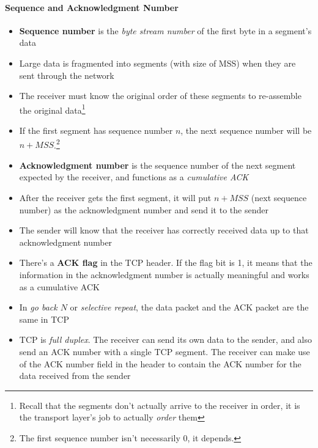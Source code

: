 \paragraph{Sequence and Acknowledgment Number}
\begin{itemize}
	\item \textbf{Sequence number} is the \textit{byte stream number} of the first byte in a segment's data
	\item Large data is fragmented into segments (with size of MSS) when they are sent through the network
	\item The receiver must know the original order of these segments to re-assemble the original data\footnote{Recall that the segments don't actually arrive to the receiver in order, it is the transport layer's job to actually \textit{order} them}
	\item If the first segment has sequence number $n$, the next sequence number will be $n+MSS$.\footnote{The first sequence number isn't necessarily 0, it depends.}
	\item \textbf{Acknowledgment number} is the sequence number of the next segment expected by the receiver, and functions as a \textit{cumulative ACK}
	\item After the receiver gets the first segment, it will put $n + MSS$ (next sequence number) as the acknowledgment number and send it to the sender
	\item The sender will know that the receiver has correctly received data up to that acknowledgment number
	\item There's a \textbf{ACK flag} in the TCP header. If the flag bit is 1, it means that the information in the acknowledgment number is actually meaningful and works as a cumulative ACK
	\item In \textit{go back $N$} or \textit{selective repeat}, the data packet and the ACK packet are the same in TCP
	\item TCP is \textit{full duplex}. The receiver can send its own data to the sender, and also send an ACK number with a single TCP segment. The receiver can make use of the ACK number field in the header to contain the ACK number for the data received from the sender
\end{itemize}

